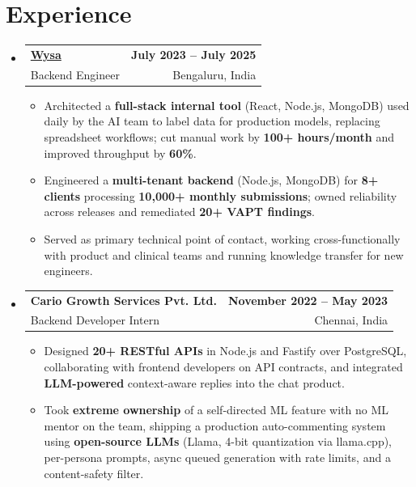 \documentclass[letterpaper,10pt]{article}
\makeatletter
\newcommand{\resumeItem}[1]{
  \item\small{#1\vspace{-1pt}}
}
\newcommand{\resumeSubheading}[4]{
  \vspace{1pt}\item
    \begin{tabular*}{0.985\textwidth}[t]{l@{\extracolsep{\fill}}r}
      \textbf{#1} & \textbf{\small #2} \\
      {\small\color{ResumeSlate} #3} & {\small\color{ResumeSlate} #4} \\
    \end{tabular*}\vspace{-6pt}
}
\newcommand{\resumeSubHeadingListStart}{\begin{itemize}[leftmargin=0.0in, label={}, itemsep=2pt, topsep=2pt]}
\newcommand{\resumeSubHeadingListEnd}{\end{itemize}}
\newcommand{\resumeItemListStart}{\begin{itemize}[leftmargin=0.18in, itemsep=2pt, topsep=1pt]}
\newcommand{\resumeItemListEnd}{\end{itemize}\vspace{-4pt}}
\makeatother
\begin{document}
\section{Experience}
\resumeSubHeadingListStart
  \resumeSubheading
    {\href{https://www.wysa.io}{Wysa}}{July 2023 -- July 2025}
    {Backend Engineer}{Bengaluru, India}
    \resumeItemListStart
      \resumeItem{Architected a \textbf{full-stack internal tool} (React, Node.js, MongoDB) used daily by the AI team to label data for production models, replacing spreadsheet workflows; cut manual work by \textbf{100+ hours/month} and improved throughput by \textbf{60\%}.}
      \resumeItem{Engineered a \textbf{multi-tenant backend} (Node.js, MongoDB) for \textbf{8+ clients} processing \textbf{10{,}000+ monthly submissions}; owned reliability across releases and remediated \textbf{20+ VAPT findings}.}
      \resumeItem{Served as primary technical point of contact, working cross-functionally with product and clinical teams and running knowledge transfer for new engineers.}
    \resumeItemListEnd
  \resumeSubheading
    {Cario Growth Services Pvt. Ltd.}{November 2022 -- May 2023}
    {Backend Developer Intern}{Chennai, India}
    \resumeItemListStart
      \resumeItem{Designed \textbf{20+ RESTful APIs} in Node.js and Fastify over PostgreSQL, collaborating with frontend developers on API contracts, and integrated \textbf{LLM-powered} context-aware replies into the chat product.}
      \resumeItem{Took \textbf{extreme ownership} of a self-directed ML feature with no ML mentor on the team, shipping a production auto-commenting system using \textbf{open-source LLMs} (Llama, 4-bit quantization via llama.cpp), per-persona prompts, async queued generation with rate limits, and a content-safety filter.}
    \resumeItemListEnd
\resumeSubHeadingListEnd
\vspace{-4pt}
\end{document}
